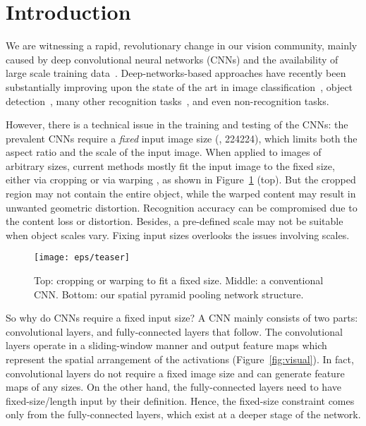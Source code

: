 \documentclass[10pt,journal,cspaper,compsoc]{IEEEtran}
\begin{document}
\maketitle

\section{Introduction}


We are witnessing a rapid, revolutionary change in our vision community, mainly caused by deep convolutional neural networks (CNNs) \cite{LeCun1989} and the availability of large scale training data~\cite{Deng2009}. Deep-networks-based approaches have recently been substantially improving upon the state of the art in image classification~\cite{Krizhevsky2012,Zeiler2013,Sermanet2013,Chatfield2014}, object detection~\cite{Girshick2014,Will2014,Sermanet2013}, many other recognition tasks~\cite{Razavian2014, Yaniv2014, Ning2014,Yunchao2014}, and even non-recognition tasks.

However, there is a technical issue in the training and testing of the CNNs: the prevalent CNNs require a \emph{fixed} input image size (\eg, 224224), which limits both the aspect ratio and the scale of the input image. When applied to images of arbitrary sizes, current methods mostly fit the input image to the fixed size, either via cropping \cite{Krizhevsky2012,Zeiler2013} or via warping \cite{Donahue2013,Girshick2014}, as shown in Figure~\ref{fig:teaser} (top). But the cropped region may not contain the entire object, while the warped content may result in unwanted geometric distortion. Recognition accuracy can be compromised due to the content loss or distortion. Besides, a pre-defined scale may not be suitable when object scales vary. Fixing input sizes overlooks the issues involving scales.

\begin{figure}[t]
\center
\texttt{[image: eps/teaser]}
\caption{Top: cropping or warping to fit a fixed size. Middle: a conventional CNN. Bottom: our spatial pyramid pooling network structure.}
\label{fig:teaser}
\end{figure}

So why do CNNs require a fixed input size?
A CNN mainly consists of two parts: convolutional layers, and fully-connected layers that follow. The convolutional layers operate in a sliding-window manner and output feature maps which represent the spatial arrangement of the activations (Figure~\ref{fig:visual}). In fact, convolutional layers do not require a fixed image size and can generate feature maps of any sizes. On the other hand, the fully-connected layers need to have fixed-size/length input by their definition. Hence, the fixed-size constraint comes only from the fully-connected layers, which exist at a deeper stage of the network.
\end{document}
